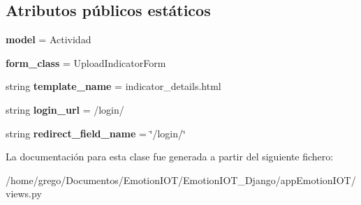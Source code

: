 \subsection*{Atributos públicos estáticos}
\begin{DoxyCompactItemize}
\item 
{\bfseries model} = Actividad\hypertarget{classappEmotionIOT_1_1views_1_1Update__indicator_aa4d78581354531e6ede7b4e319495a5f}{}\label{classappEmotionIOT_1_1views_1_1Update__indicator_aa4d78581354531e6ede7b4e319495a5f}

\item 
{\bfseries form\+\_\+class} = Upload\+Indicator\+Form\hypertarget{classappEmotionIOT_1_1views_1_1Update__indicator_ad9fb70f6e884c85383e41a15f2a03ba5}{}\label{classappEmotionIOT_1_1views_1_1Update__indicator_ad9fb70f6e884c85383e41a15f2a03ba5}

\item 
string {\bfseries template\+\_\+name} = \textquotesingle{}indicator\+\_\+details.\+html\textquotesingle{}\hypertarget{classappEmotionIOT_1_1views_1_1Update__indicator_aacb94db933054f203869ce9ccb883145}{}\label{classappEmotionIOT_1_1views_1_1Update__indicator_aacb94db933054f203869ce9ccb883145}

\item 
string {\bfseries login\+\_\+url} = \textquotesingle{}/login/\textquotesingle{}\hypertarget{classappEmotionIOT_1_1views_1_1Update__indicator_aa9771ff0920cc747b2a39fb1e011d9dc}{}\label{classappEmotionIOT_1_1views_1_1Update__indicator_aa9771ff0920cc747b2a39fb1e011d9dc}

\item 
string {\bfseries redirect\+\_\+field\+\_\+name} = \char`\"{}/login/\char`\"{}\hypertarget{classappEmotionIOT_1_1views_1_1Update__indicator_a86d85ad004414f2f71e08d4429c7fdbd}{}\label{classappEmotionIOT_1_1views_1_1Update__indicator_a86d85ad004414f2f71e08d4429c7fdbd}

\end{DoxyCompactItemize}


La documentación para esta clase fue generada a partir del siguiente fichero\+:\begin{DoxyCompactItemize}
\item 
/home/grego/\+Documentos/\+Emotion\+I\+O\+T/\+Emotion\+I\+O\+T\+\_\+\+Django/app\+Emotion\+I\+O\+T/views.\+py\end{DoxyCompactItemize}

